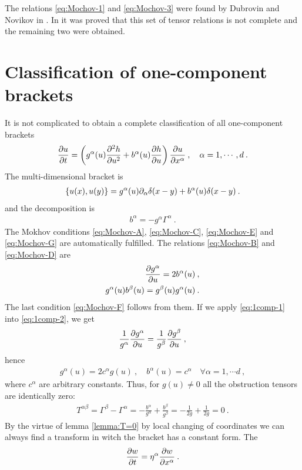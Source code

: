 \begin{remark}
    The relations \eqref{eq:Mochov-1} and \eqref{eq:Mochov-3} were found by Dubrovin and Novikov in \cite{Dubrovin-Novikov}. In \cite{Mochov} it was proved that this set of tensor relations is not complete and the remaining two were obtained.
\end{remark}

\section{Classification of one-component brackets}

It is not complicated to obtain a complete classification of all one-component brackets
\begin{align}
    \frac{\partial u}{\partial t} = \left( g^{\alpha}(u) \frac{\partial ^2h}{\partial u^2} + b^{\alpha}(u) \frac{\partial h}{\partial u} \right) \frac{\partial u}{\partial x^\alpha} \:, \quad \alpha = 1, \cdots, d \:.
\end{align}
The multi-dimensional bracket is 
\begin{align}
    \left \lbrace u(x),u(y) \right \rbrace = g^{\alpha}(u) \partial_\alpha \delta(x-y) + b^\alpha(u) \delta(x-y) \:.
\end{align}
and the decomposition is
\begin{align}
    b^\alpha = - g^\alpha \Gamma^\alpha \:.
\end{align}
The Mokhov conditions \eqref{eq:Mochov-A}, \eqref{eq:Mochov-C}, \eqref{eq:Mochov-E} and \eqref{eq:Mochov-G} are automatically fulfilled. The relations \eqref{eq:Mochov-B} and \eqref{eq:Mochov-D} are
\begin{align}
    \frac{\partial g^\alpha}{\partial u} = 2 b^\alpha(u) \:, \label{eq:1comp-1} \\
    g^\alpha(u) b^\beta(u) = g^\beta(u) g^\alpha(u) \label{eq:1comp-2}\:.
\end{align}
The last condition \eqref{eq:Mochov-F} follows from them. If we apply \eqref{eq:1comp-1} into \eqref{eq:1comp-2}, we get
\begin{align}
    \frac{1}{g^\alpha} \frac{\partial g^\alpha}{\partial u}= \frac{1}{g^\beta}\frac{\partial g^\beta}{\partial u} \:,
\end{align}
hence
\begin{align}
    g^\alpha(u) = 2c^\alpha g(u) \:, \quad b^\alpha(u) = c^\alpha \quad \forall \alpha = 1, \cdots d \:,
\end{align}
where $c^\alpha$ are arbitrary constants.
Thus, for $g(u) \neq 0$ all the obstruction tensors are identically zero:
\begin{align}
    T^{\alpha \beta} = \Gamma^\beta - \Gamma^\alpha = -\frac{b^\alpha}{g^\alpha} + \frac{b^\beta}{g^\beta} = - \frac{1}{2 g} + \frac{1}{2g} = 0 \:.
\end{align}
By the virtue of lemma \vref{lemma:T=0} by local changing of coordinates we can always find a transform in witch the bracket has a constant form. The 
\begin{align}
    \frac{\partial w}{\partial t} = \eta^\alpha \frac{\partial w}{\partial x^\alpha} \:.
\end{align}


